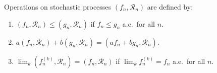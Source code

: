 Operations on stochastic processes $(f_n, \mathcal{R}_n)$ are defined by:
\begin{enumerate}
\item $(f_n, \mathcal{R}_n) \leq (g_n, \mathcal{R}_n)$ if $f_n \leq g_n$ a.e.\ for all $n$.
\item $a(f_n, \mathcal{R}_n) + b(g_n, \mathcal{R}_n) = (a f_n + b g_n, \mathcal{R}_n)$.
\item $\lim_k (f_n^{(k)}, \mathcal{R}_n) = (f_n, \mathcal{R}_n)$ if $\lim_k f_n^{(k)} = f_n$ a.e.\ for all $n$.
\end{enumerate}
